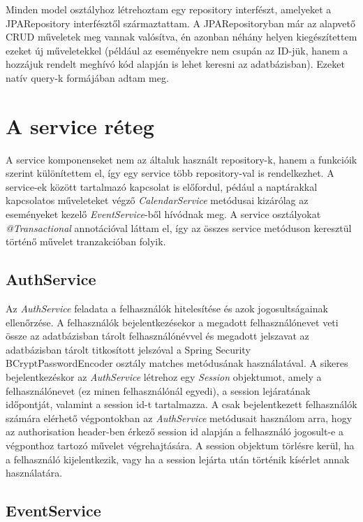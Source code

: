 \documentclass[a4paper,12pt]{report}
\theoremstyle{definition}
\theoremstyle{remark}
\begin{document}
Minden model osztályhoz létrehoztam egy repository interfészt, amelyeket a JPARepository interfésztől származtattam. A JPARepositoryban már az alapvető CRUD műveletek meg vannak valósítva, én azonban néhány helyen kiegészítettem ezeket új műveletekkel (például az eseményekre nem csupán az ID-jük, hanem a hozzájuk rendelt meghívó kód alapján is lehet keresni az adatbázisban). Ezeket natív query-k formájában adtam meg.

\section{A service réteg}

A service komponenseket nem az általuk használt repository-k, hanem a funkcióik szerint különítettem el, így egy service több repository-val is rendelkezhet. A service-ek között tartalmazó kapcsolat is előfordul, pédául a naptárakkal kapcsolatos műveleteket végző \textit{CalendarService} metódusai kizárólag az eseményeket kezelő \textit{EventService}-ből hívódnak meg. A service osztályokat \textit{@Transactional} annotációval láttam el, így az összes service metóduson keresztül történő művelet tranzakcióban folyik.

\subsection{AuthService}

Az \textit{AuthService} feladata a felhasználók hitelesítése és azok jogosultságainak ellenőrzése. A felhasználók bejelentkezésekor a megadott felhasználónevet veti össze az adatbázisban tárolt felhasználónévvel és megadott jelszavat az adatbázisban tárolt titkosított jelszóval a Spring Security BCryptPasswordEncoder osztály matches metódusának használatával. A sikeres bejelentkezéskor az \textit{AuthService} létrehoz egy \textit{Session} objektumot, amely a felhasználónevet (ez minen felhasználónál egyedi), a session lejáratának időpontját, valamint a session id-t tartalmazza.  A csak bejelentkezett felhasználók számára elérhető végpontokban az \textit{AuthService} metódusait használom arra, hogy az authorisation header-ben érkező session id alapján a felhasználó jogosult-e a végponthoz tartozó művelet végrehajtására. A session objektum törlésre kerül, ha a felhasználó kijelentkezik, vagy ha a session lejárta után történik kísérlet annak használatára.

\subsection{EventService}
\end{document}
